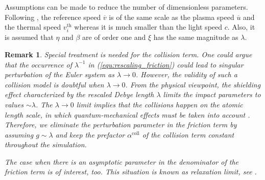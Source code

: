 \documentclass{article}
\newtheorem*{remark}{Remark}
\begin{document}
Assumptions can be made to reduce the number of dimensionless parameters. Following
\cite[][Sec. 2.2]{degond_2017}, the reference speed $\overline{v}$ is of the same scale as
the plasma speed $\overline{u}$ and the thermal speed $v_i^{\text{th}}$ whereas it is much
smaller than the light speed $c$. Also, it is assumed that $\eta$ and $\beta$ are of order
one and $\xi$ has the same magnitude as $\lambda$.

\begin{remark}
Special treatment is needed for the collision term. One could argue that the occurrence of
$\lambda^{-1}$ in (\ref{equ:rescaling_friction}) could lead to singular perturbation of
the Euler system as $\lambda \rightarrow 0$. However, the validity of such a collision
model is doubtful when $\lambda \rightarrow 0$. From the physical viewpoint, the shielding
effect characterized by the rescaled Debye length $\lambda$ limits the impact parameters
to values $\sim\lambda$. The $\lambda \rightarrow 0$ limit implies that the collisions
happen on the atomic length scale, in which quantum-mechanical effects must be taken into
account \cite[][pp. 144-148]{frank_1972}. Therefore, we eliminate the perturbation
parameter in the friction term by assuming $g \sim \lambda$ and keep the prefactor
$\alpha^{\text{coll}}$ of the collision term constant throughout the simulation.

The case when there is an asymptotic parameter in the denominator of the friction term is
of interest, too. This situation is known as relaxation limit, see \cite{peng_2011,
  wasiolek_2016, Li_2021, Chen_2000}.
\end{remark}
\end{document}
